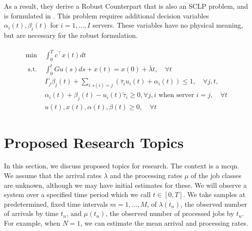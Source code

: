\documentclass[11pt,a4paper,titlepage]{article}
\theoremstyle{definition}
\theoremstyle{plain}
\begin{document}
    As a result, they derive a Robust Counterpart that is also an SCLP problem,
    and is formulated in .
    This problem requires additional decision variables $\alpha_i(t), \beta_i(t)$
    for $i=1,\ldots,I$ servers.
    These variables have no physical meaning,
    but are necessary for the robust formulation.

    \begin{align}
        \begin{split}
            \label{eq:mcqn-robust-counterpart}
            \min & \int_{0}^{T} {c}^{\top} {x}(t) d t \\
            \text { s.t. } & \int_{0}^{t} G {u}(s) d s+{x}(t)={x}(0)+\overline{{\lambda}} t, \quad \forall t \\
            & \Gamma_{j} \beta_{j}(t)+\sum_{i: s(i)=j}\left(\bar{\tau}_{i} u_{i}(t)+\alpha_{i}(t)\right) \leq 1, \quad \forall j, t, \\
            & \alpha_{i}(t)+\beta_{j}(t)-u_{i}(t) \tilde{\tau}_{i} \geq 0, \forall j, i \text { when server~} i=j, \quad \forall t \\
            & {u}(t), {x}(t), {\alpha}(t), {\beta}(t) \geq {0}, \quad \forall t
        \end{split}
    \end{align}



    \section{Proposed Research Topics}
    \label{sec:topics}

    In this section,
    we discuss proposed topics for research.
    The context is a \gls{mcqn}.
    We assume that the arrival rates $\lambda$
    and the processing rates $\mu$ of the job classes are unknown,
    although we may have initial estimates for these.
    We will observe a system over a specified time period which we call $t \in [0,T]$.
    We take samples at predetermined,
    fixed time intervals $m=1,\ldots,M$,
    of $\lambda(t_n)$,
    the observed number of arrivals by time $t_n$,
    and $\mu(t_n)$,
    the observed number of processed jobs by $t_n$.
    For example,
    when $N=1$,
    we can estimate the mean arrival and processing rates.
\end{document}
